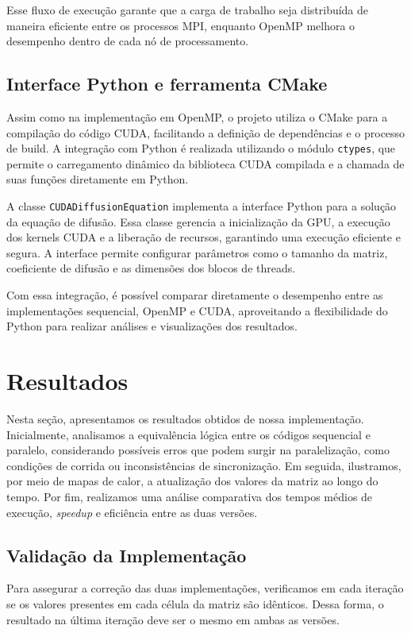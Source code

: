 \documentclass[12pt]{article}
\begin{document}
Esse fluxo de execução garante que a carga de trabalho seja distribuída de maneira eficiente entre os processos MPI, enquanto OpenMP melhora o desempenho dentro de cada nó de processamento.

\subsection{Interface Python e ferramenta CMake}

Assim como na implementação em OpenMP, o projeto utiliza o CMake para a compilação do código CUDA, facilitando a definição de dependências e o processo de build. A integração com Python é realizada utilizando o módulo \texttt{ctypes}, que permite o carregamento dinâmico da biblioteca CUDA compilada e a chamada de suas funções diretamente em Python.

A classe \texttt{CUDADiffusionEquation} implementa a interface Python para a solução da equação de difusão. Essa classe gerencia a inicialização da GPU, a execução dos kernels CUDA e a liberação de recursos, garantindo uma execução eficiente e segura. A interface permite configurar parâmetros como o tamanho da matriz, coeficiente de difusão e as dimensões dos blocos de threads.

Com essa integração, é possível comparar diretamente o desempenho entre as implementações sequencial, OpenMP e CUDA, aproveitando a flexibilidade do Python para realizar análises e visualizações dos resultados.

\section{Resultados}

Nesta seção, apresentamos os resultados obtidos de nossa implementação.
Inicialmente, analisamos a equivalência lógica entre os códigos sequencial e
paralelo, considerando possíveis erros que podem surgir na paralelização, como
condições de corrida ou inconsistências de sincronização. Em seguida,
ilustramos, por meio de mapas de calor, a atualização dos valores da matriz ao
longo do tempo. Por fim, realizamos uma análise comparativa dos tempos médios
de execução, \textit{speedup} e eficiência entre as duas versões.

\subsection{Validação da Implementação}

Para assegurar a correção das duas implementações, verificamos em cada iteração
se os valores presentes em cada célula da matriz são idênticos. Dessa forma, o
resultado na última iteração deve ser o mesmo em ambas as versões.
\end{document}
